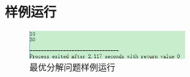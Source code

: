\documentclass[UTF8]{ctexart}
\begin{document}
    \subsection{样例运行}
    \begin{figure}[!htb]
      \centering
      \includegraphics[width=0.6\textwidth]{../img/4.15.PNG}
      \caption{最优分解问题样例运行}\label{最优分解问题样例运行}
    \end{figure}
\end{document}
